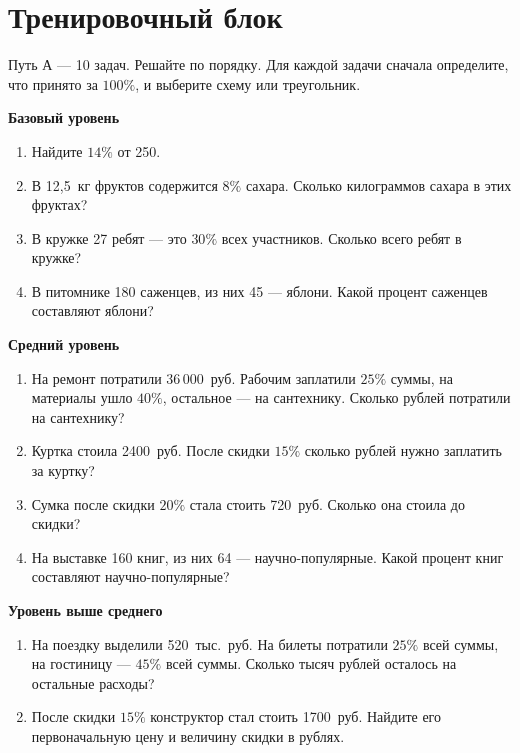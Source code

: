 \documentclass[a4paper,12pt]{article}
\newcommand{\sectionrule}{\par\vspace{-5pt}{\color{accent}\rule{\linewidth}{0.5pt}}\vspace{5pt}}
\newcommand{\ctitle}[1]{\section*{\color{darkaccent}#1}\sectionrule}
\begin{document}
\clearpage
\ctitle{Тренировочный блок}
\textcolor{softgray}{\small Путь А --- 10 задач. Решайте по порядку. Для каждой задачи сначала определите, что принято за $100\%$, и выберите схему или треугольник.}\par
\vspace{4pt}
\textbf{Базовый уровень}
\begin{enumerate}[label=\textbf{\arabic*.}]
\item Найдите $14\%$ от 250.
\item В 12{,}5~кг фруктов содержится $8\%$ сахара. Сколько килограммов сахара в этих фруктах?
\item В кружке 27 ребят --- это $30\%$ всех участников. Сколько всего ребят в кружке?
\item В питомнике 180 саженцев, из них 45 --- яблони. Какой процент саженцев составляют яблони?
\end{enumerate}
\vspace{3pt}
\textbf{Средний уровень}
\begin{enumerate}[label=\textbf{\arabic*.},start=5]
\item На ремонт потратили 36\,000~руб. Рабочим заплатили $25\%$ суммы, на материалы ушло $40\%$, остальное --- на сантехнику. Сколько рублей потратили на сантехнику?
\item Куртка стоила 2400~руб. После скидки $15\%$ сколько рублей нужно заплатить за куртку?
\item Сумка после скидки $20\%$ стала стоить 720~руб. Сколько она стоила до скидки?
\item На выставке 160 книг, из них 64 --- научно-популярные. Какой процент книг составляют научно-популярные?
\end{enumerate}
\vspace{3pt}
\textbf{Уровень выше среднего}
\begin{enumerate}[label=\textbf{\arabic*.},start=9]
\item На поездку выделили 520~тыс.~руб. На билеты потратили $25\%$ всей суммы, на гостиницу --- $45\%$ всей суммы. Сколько тысяч рублей осталось на остальные расходы?
\item После скидки $15\%$ конструктор стал стоить 1700~руб. Найдите его первоначальную цену и величину скидки в рублях.
\end{enumerate}
\end{document}
